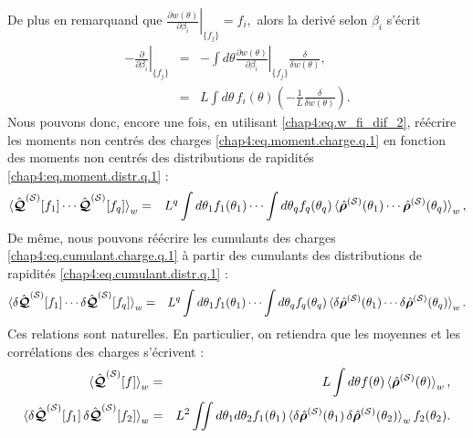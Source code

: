De plus en remarquand que 
\(
	\left. \frac{ \partial w (\theta) }{ \partial \beta_i } \right|_{\{f_j\}} = f_i ,		
\)
alors la derivé selon $\beta_i$ s'écrit 
\begin{eqnarray}\label{chap4:eq.w_fi_dif_2}
	-\left. \frac{ \partial}{ \partial \beta_i } \right|_{\{f_j\}} & = & - \int d \theta  \left. \frac{ \partial w (\theta) }{ \partial \beta_i } \right|_{\{f_j\}} \frac{\delta}{\delta w(\theta)} \nonumber ,\\
	& = & L \int d\theta \, f_i(\theta) \left ( - \frac{1}{L} 	\frac{\delta}{\delta w(\theta)} \right ) \label{chap4:eq.moment.charge.q.2}.
\end{eqnarray}
Nous pouvons donc, encore une fois, en utilisant \eqref{chap4:eq.w_fi_dif_2}, réécrire les moments non centrés des charges \eqref{chap4:eq.moment.charge.q.1} en fonction des moments non centrés des distributions de rapidités \eqref{chap4:eq.moment.distr.q.1} : 
\begin{eqnarray}
	\braket{\hat{\bm{\mathcal{Q}}}^{(\mathcal{S})}[f_1] \cdots \hat{\bm{\mathcal{Q}}}^{(\mathcal{S})}[f_q]}_w  & = & L^q \int d\theta_1 f_1(\theta_1)  \cdots  \int d\theta_q f_q(\theta_q)  \braket{\hat{\bm{\rho}}^{(\mathcal{S})}(\theta_1)\cdots \hat{\bm{\rho}}^{(\mathcal{S})}(\theta_q)}_w,	
\end{eqnarray}
De même, nous pouvons réécrire les cumulants des charges \eqref{chap4:eq.cumulant.charge.q.1} à partir des cumulants des distributions de rapidités \eqref{chap4:eq.cumulant.distr.q.1} :
\begin{eqnarray}
	\braket{\delta\hat{\bm{\mathcal{Q}}}^{(\mathcal{S})}[f_1] \cdots \delta\hat{\bm{\mathcal{Q}}}^{(\mathcal{S})}[f_q]}_w  & = & L^q \int d\theta_1 f_1(\theta_1)  \cdots  \int d\theta_q f_q(\theta_q)  \braket{\delta\hat{\bm{\rho}}^{(\mathcal{S})}(\theta_1)\cdots \delta\hat{\bm{\rho}}^{(\mathcal{S})}(\theta_q)}_w.	
\end{eqnarray}
Ces relations sont naturelles. En particulier, on retiendra que les moyennes et les corrélations des charges s’écrivent :
\begin{eqnarray}
	\braket{\hat{\bm{\mathcal{Q}}}^{(\mathcal{S})}[f] }_w  & = & L \int d\theta f(\theta)  \braket{\hat{\bm{\rho}}^{(\mathcal{S})}(\theta)}_w,\\
	\braket{\delta\hat{\bm{\mathcal{Q}}}^{(\mathcal{S})}[f_1] \, \delta\hat{\bm{\mathcal{Q}}}^{(\mathcal{S})}[f_2]}_w  & = & L^2 \iint d\theta_1 d\theta_2 f_1(\theta_1) \braket{\delta\hat{\bm{\rho}}^{(\mathcal{S})}(\theta_1)\, \delta\hat{\bm{\rho}}^{(\mathcal{S})}(\theta_2)}_w  f_2(\theta_2) .		
\end{eqnarray}



